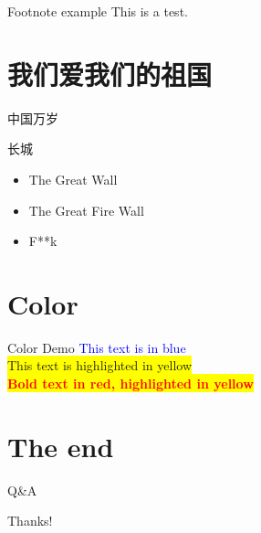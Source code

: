 \documentclass[hyperref={unicode}]{beamer}
\begin{document}
\begin{CJK}{UTF8}{gkai}
\begin{frame}{Footnote example}
   This is a test.
\end{frame}

\section{我们爱我们的祖国}
\begin{frame}{中国万岁}
\begin{block}{长城}
  \begin{itemize}
  \item   The Great Wall 
  \item  The Great Fire Wall
  \item F**k
  \end{itemize}
\end{block}  
\end{frame}

\section{Color}
\begin{frame}{Color Demo}
  \textcolor{blue}{This text is in blue} \\
  \colorbox{yellow}{This text is highlighted in yellow}  \\

  \colorbox{yellow}{ 
    \textcolor{red}{ 
        \textbf{ 
            Bold text in red, highlighted in yellow 
        } 
    } 
} 


\setlength{\fboxrule}{4pt} 

\setlength{\fboxrule}{4pt} 
\setlength{\fboxsep}{0pt} 

\end{frame}

\section{The end}
\begin{frame}{Q\&A}
  \begin{center}
    \LARGE{\alert{Thanks!}}
  \end{center}
\end{frame}

\end{CJK}
\end{document}
